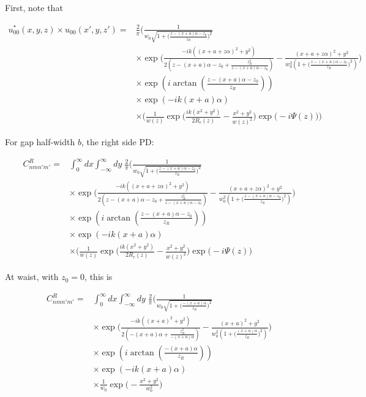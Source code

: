 \documentclass[aps,twoside,secnumarabic,balancelastpage,amsmath,amssymb,nofootinbib,hyperref=pdftex]{revtex4}
\newcommand{\bigfrac}[2]{\Big( \frac{#1}{#2}\Big)}
\begin{document}
First, note that

\begin{align*}
	u_{00}^* (x,y,z) \times u_{00}(x',y,z') =&
		\frac{2}{\pi}
		\Big(
			\frac{1}{w_0 \sqrt{1+\bigfrac{z-(x+a)\alpha -z_0}{z_R}^2}}
			\\&
			\times
			\exp 
			\Big(
			\frac
			{
			-ik((x+a+z\alpha)^{2}		
			+y^{2})
			}
			{2( z-(x+a)\alpha  - z_0 + 
			\frac{z_R^2}{z-(x+a)\alpha -z_0 } ) }-
			\frac{(x+a+z\alpha)^{2}  +y^{2}}
			{
				w_0^2 (1+\bigfrac{z-(x+a)\alpha-z_0}{z_R}^2)
			}
			\Big)
			\\&
			\times \exp(
			i \arctan( \frac{z-(x+a)\alpha - z_0}{z_R}) )				
			\\&
			\times \exp(
			-ik(x+a)\alpha )	
		\\ &\times
		\Big(
			\frac{1}{w(z)}
			\exp \Big(\frac{ik(x^{2}+y^{2})}{2R_{c}(z)}-
			\frac{x^{2}+y^{2}}{w(z)^{2}} \Big) 
			\exp \Big( -i\Psi(z) \Big)
		\Big)
\end{align*}

For gap half-width $b$, the right side PD:

\begin{align*}
		C_{nmn'm'}^{R} =&
		\int_{0}^{\infty} dx\int_{-\infty}^{\infty}  dy \;
		\frac{2}{\pi}
		\Big(
			\frac{1}{w_0 \sqrt{1+\bigfrac{z-(x+a)\alpha -z_0}{z_R}^2}}
			\\&
			\times
			\exp 
			\Big(
			\frac
			{
			-ik((x+a+z\alpha)^{2}		
			+y^{2})
			}
			{2( z-(x+a)\alpha  - z_0 + 
			\frac{z_R^2}{z-(x+a)\alpha -z_0 } ) }-
			\frac{(x+a+z\alpha)^{2}  +y^{2}}
			{
				w_0^2 (1+\bigfrac{z-(x+a)\alpha-z_0}{z_R}^2)
			}
			\Big)
			\\&
			\times \exp(
			i \arctan( \frac{z-(x+a)\alpha - z_0}{z_R}) )				
			\\&
			\times \exp(
			-ik(x+a)\alpha )	
		\\ &\times
		\Big(
			\frac{1}{w(z)}
			\exp \Big(\frac{ik(x^{2}+y^{2})}{2R_{c}(z)}-
			\frac{x^{2}+y^{2}}{w(z)^{2}} \Big) 
			\exp \Big( -i\Psi(z) \Big)
\end{align*}

At waist, with $z_0=0$, this is

\begin{align*}
		C_{nmn'm'}^{R} =&
		\int_{0}^{\infty} dx\int_{-\infty}^{\infty}  dy \;
		\frac{2}{\pi}
		\Big(
			\frac{1}{w_0 \sqrt{1+\bigfrac{-(x+a)\alpha}{z_R}^2}}
			\\&
			\times
			\exp 
			\Big(
			\frac
			{
			-ik((x+a)^{2}		
			+y^{2})
			}
			{2( -(x+a)\alpha  + 
			\frac{z_R^2}{-(x+a)\alpha  } ) }-
			\frac{(x+a)^{2}  +y^{2}}
			{
				w_0^2 (1+\bigfrac{(x+a)\alpha}{z_R}^2)
			}
			\Big)
			\\&
			\times \exp(
			i \arctan( \frac{-(x+a)\alpha }{z_R}) )				
			\\&
			\times \exp(
			-ik(x+a)\alpha )	
		\\ &\times
			\frac{1}{w_0}
			\exp 
				\Big(-
					\frac{x^{2}+y^{2}}{w_0^{2}} 
				\Big) 
\end{align*}
\end{document}
